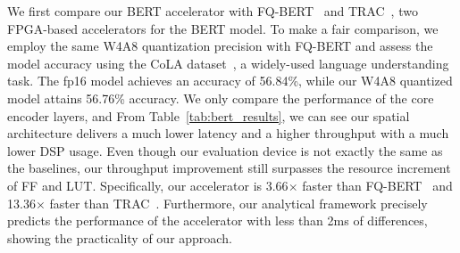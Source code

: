 We first compare our BERT accelerator with FQ-BERT~\cite{liu2021fqbert} and TRAC~\cite{patrick2022trac}, two FPGA-based accelerators for the BERT model.
To make a fair comparison, we employ the same W4A8 quantization precision with FQ-BERT and assess the model accuracy using the CoLA dataset~\cite{devlin2018bert}, a widely-used language understanding task.
The fp16 model achieves an accuracy of 56.84\%, while our W4A8 quantized model attains 56.76\% accuracy.
We only compare the performance of the core encoder layers, and 
From Table~\ref{tab:bert_results},
we can see our spatial architecture delivers a much lower latency and a higher throughput with a much lower DSP usage.
Even though our evaluation device is not exactly the same as the baselines, our throughput improvement still surpasses the resource increment of FF and LUT.
Specifically, our accelerator is 3.66$\times$ faster than FQ-BERT~\cite{liu2021fqbert} and 13.36$\times$ faster than TRAC~\cite{patrick2022trac}.
Furthermore, our analytical framework precisely predicts the performance of the accelerator with less than 2ms of differences, showing the practicality of our approach.

